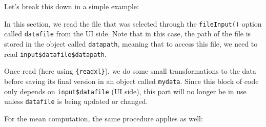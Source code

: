 \documentclass[
]{book}
\newenvironment{Shaded}{\begin{snugshade}}{\end{snugshade}}
\newcommand{\AttributeTok}[1]{\textcolor[rgb]{0.77,0.63,0.00}{#1}}
\newcommand{\DecValTok}[1]{\textcolor[rgb]{0.00,0.00,0.81}{#1}}
\newcommand{\FunctionTok}[1]{\textcolor[rgb]{0.00,0.00,0.00}{#1}}
\newcommand{\NormalTok}[1]{#1}
\newcommand{\OtherTok}[1]{\textcolor[rgb]{0.56,0.35,0.01}{#1}}
\newcommand{\SpecialCharTok}[1]{\textcolor[rgb]{0.00,0.00,0.00}{#1}}
\newcommand{\StringTok}[1]{\textcolor[rgb]{0.31,0.60,0.02}{#1}}
\begin{document}
Let's break this down in a simple example:

\begin{Shaded}
\end{Shaded}

In this section, we read the file that was selected through the \texttt{fileInput()} option called \texttt{datafile} from the UI side. Note that in this case, the path of the file is stored in the object called \texttt{datapath}, meaning that to access this file, we need to read \texttt{input\$datafile\$datapath}.

Once read (here using \texttt{\{readxl\}}), we do some small transformations to the data before saving its final version in an object called \texttt{mydata}. Since this block of code only depends on \texttt{input\$datafile} (UI side), this part will no longer be in use unless \texttt{datafile} is being updated or changed.

For the mean computation, the same procedure applies as well:
\end{document}
